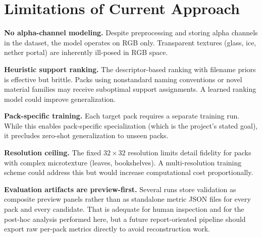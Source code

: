 \section{Limitations of Current Approach}

\textbf{No alpha-channel modeling.} Despite preprocessing and storing alpha
channels in the dataset, the model operates on RGB only. Transparent textures
(glass, ice, nether portal) are inherently ill-posed in RGB space.

\textbf{Heuristic support ranking.} The descriptor-based ranking with filename
priors is effective but brittle. Packs using nonstandard naming conventions or
novel material families may receive suboptimal support assignments. A learned
ranking model could improve generalization.

\textbf{Pack-specific training.} Each target pack requires a separate training
run. While this enables pack-specific specialization (which is the project's
stated goal), it precludes zero-shot generalization to unseen packs.

\textbf{Resolution ceiling.} The fixed $32\times32$ resolution limits detail
fidelity for packs with complex microtexture (leaves, bookshelves). A
multi-resolution training scheme could address this but would increase
computational cost proportionally.

\textbf{Evaluation artifacts are preview-first.} Several runs store validation
as composite preview panels rather than as standalone metric JSON files for
every pack and every candidate. That is adequate for human inspection and for
the post-hoc analysis performed here, but a future report-oriented pipeline
should export raw per-pack metrics directly to avoid reconstruction work.
